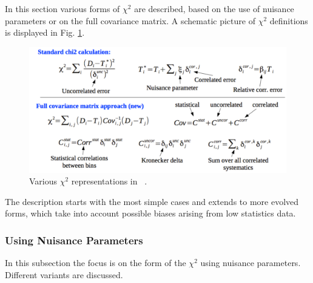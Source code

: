 \label{sec:chi2}
In this section various forms of $\chi^2$ are described, 
based on the use of nuisance parameters or on the full covariance matrix.
A schematic picture of $\chi^2$ definitions is displayed in Fig. \ref{fig:chi2}.
\begin{figure}
\begin{center}
\includegraphics[width=0.75\linewidth]{figures/chi2.pdf}
\end{center}
\caption{Various $\chi^2$ representations in \fitter\ .}
\label{fig:chi2}
\end{figure}
The description starts with the most simple cases and extends to more evolved forms, which take into account possible biases 
arising from low statistics data. 

\subsubsection{Using Nuisance Parameters}

In this subsection the focus is on the form of the $\chi^2$ using nuisance parameters. Different variants are discussed.


